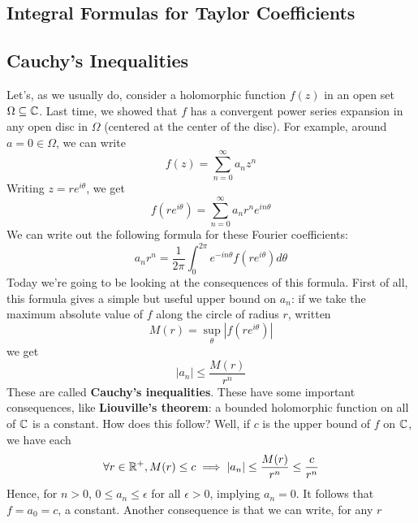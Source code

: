 \documentclass{article}
\begin{document}
\subsection{Integral Formulas for Taylor Coefficients}

\subsection{Cauchy's Inequalities}

Let's, as we usually do, consider a holomorphic function \(f(z)\) in an open set \(\Omega \subseteq \mathbb{C}\). Last time, we showed that \(f\) has a convergent power series expansion in any open disc in \(\Omega\) (centered at the center of the disc). For example, around \(a = 0 \in \Omega\), we can write
\begin{equation}f(z) = \sum_{n = 0}^\infty a_nz^n\end{equation}
Writing \(z = re^{i\theta}\), we get
\begin{equation}f(re^{i\theta}) = \sum_{n = 0}^\infty a_nr^ne^{in\theta}\end{equation}
We can write out the following formula for these Fourier coefficients:
\begin{equation}a_nr^n = \frac{1}{2\pi}\int_0^{2\pi}e^{-in\theta}f(re^{i\theta})d\theta\end{equation}
Today we're going to be looking at the consequences of this formula. First of all, this formula gives a simple but useful upper bound on \(a_n\): if we take the maximum absolute value of \(f\) along the circle of radius \(r\), written
\begin{equation}M(r) = \sup_\theta|f(re^{i\theta})|\end{equation}
we get
\begin{equation}|a_n| \leq \frac{M(r)}{r^n}\end{equation}
These are called \textbf{Cauchy's inequalities}. These have some important consequences, like \textbf{Liouville's theorem}: a bounded holomorphic function on all of \(\mathbb{C}\) is a constant. How does this follow? Well, if \(c\) is the upper bound of \(f\) on \(\mathbb{C}\), we have each
\begin{equation}\forall r \in \mathbb{R}^+, M(r) \leq c \implies |a_n| \leq \frac{M(r)}{r^n} \leq \frac{c}{r^n}\end{equation}
Hence, for \(n > 0\), \(0 \leq a_n \leq \epsilon\) for all \(\epsilon > 0\), implying \(a_n = 0\). It follows that \(f = a_0 = c\), a constant. Another consequence is that we can write, for any \(r\)
\end{document}
